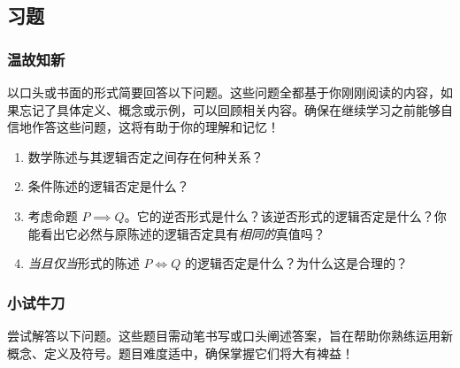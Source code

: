 \subsection{习题}

\subsubsection*{温故知新}

以口头或书面的形式简要回答以下问题。这些问题全都基于你刚刚阅读的内容，如果忘记了具体定义、概念或示例，可以回顾相关内容。确保在继续学习之前能够自信地作答这些问题，这将有助于你的理解和记忆！

\begin{enumerate}[label=(\arabic*)]
    \item 数学陈述与其逻辑否定之间存在何种关系？
    \item 条件陈述的逻辑否定是什么？
    \item 考虑命题 $P \implies Q$。它的逆否形式是什么？该逆否形式的逻辑否定是什么？你能看出它必然与原陈述的逻辑否定具有\emph{相同的}真值吗？
    \item \emph{当且仅当}形式的陈述 $P \iff Q$ 的逻辑否定是什么？为什么这是合理的？
\end{enumerate}

\subsubsection*{小试牛刀}

尝试解答以下问题。这些题目需动笔书写或口头阐述答案，旨在帮助你熟练运用新概念、定义及符号。题目难度适中，确保掌握它们将大有裨益！

